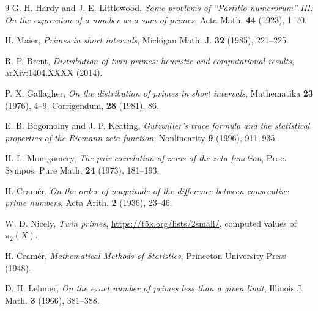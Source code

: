 \documentclass[11pt]{article}
\begin{document}
\begin{thebibliography}{9}
G. H. Hardy and J. E. Littlewood, \textit{Some problems of ``Partitio numerorum'' III: On the expression of a number as a sum of primes}, Acta Math. \textbf{44} (1923), 1--70.

H. Maier, \textit{Primes in short intervals}, Michigan Math. J. \textbf{32} (1985), 221--225.

R. P. Brent, \textit{Distribution of twin primes: heuristic and computational results}, arXiv:1404.XXXX (2014).

P. X. Gallagher, \textit{On the distribution of primes in short intervals}, Mathematika \textbf{23} (1976), 4--9. Corrigendum, \textbf{28} (1981), 86.

E. B. Bogomolny and J. P. Keating, \textit{Gutzwiller's trace formula and the statistical properties of the Riemann zeta function}, Nonlinearity \textbf{9} (1996), 911--935.

H. L. Montgomery, \textit{The pair correlation of zeros of the zeta function}, Proc. Sympos. Pure Math. \textbf{24} (1973), 181--193.

H. Cram\'{e}r, \textit{On the order of magnitude of the difference between consecutive prime numbers}, Acta Arith. \textbf{2} (1936), 23--46.

W. D. Nicely, \textit{Twin primes}, \url{https://t5k.org/lists/2small/}, computed values of $\pi_2(X)$.

H. Cram\'{e}r, \textit{Mathematical Methods of Statistics}, Princeton University Press (1948).

D. H. Lehmer, \textit{On the exact number of primes less than a given limit}, Illinois J. Math. \textbf{3} (1966), 381--388.
\end{thebibliography}
\end{document}
